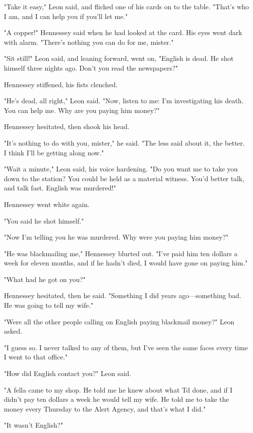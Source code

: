 \documentclass{novel}
\begin{document}
"Take it easy," Leon said, and flicked one of his cards on to the table. "That's who I am, and I can help you if you'll let me."

"A copper!" Hennessey said when he had looked at the card. His eyes went dark with alarm. "There's nothing you can do for me, mister."

"Sit still!" Leon said, and leaning forward, went on, "English is dead. He shot himself three nights ago. Don't you read the newspapers?"

Hennessey stiffened, his fists clenched.

"He's dead, all right," Leon said. "Now, listen to me: I'm investigating his death. You can help me. Why are you paying him  money?"

Hennessey hesitated, then shook his head.

"It's nothing to do with you, mister," he said. "The less said about it, the better. I think I'll be getting along now."

"Wait a minute," Leon said, his voice hardening. "Do you want me to take you down to the station? You could be held as a material witness. You'd better talk, and talk fast. English was murdered!"

Hennessey went white again.

"You said he shot himself."

"Now I'm telling you he was murdered. Why were you paying him money?"

"He was blackmailing me," Hennessey blurted out. "I've paid him ten dollars a week for eleven months, and if he hadn't died, I would have gone on paying him."

"What had he got on you?"

Hennessey hesitated, then he said. "Something I did years ago—something bad. He was going to tell my wife."

"Were all the other people calling on English paying blackmail money?" Leon asked.

"I guess so. I never talked to any of them, but I've seen the same faces every time I went to that office."

"How did English contact you?" Leon said.

"A fella came to my shop. He told me he knew about what Td done, and if I didn't pay ten dollars a week he would tell my wife. He told me to take the money every Thursday to the Alert Agency, and that's what I did."

"It wasn't English?"
\end{document}
